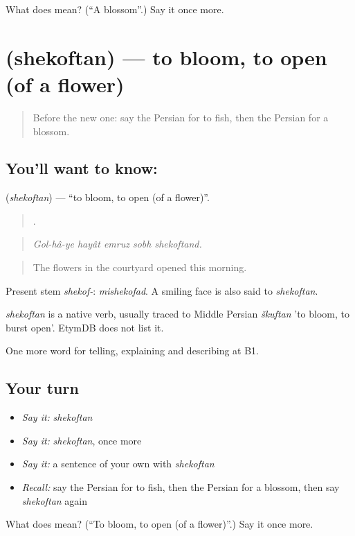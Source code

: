\begin{tcolorbox}[breakable,colback=teal!4,colframe=teal!35!black,title={Before you move on}]
What does  mean? (\textquotedblleft{}A blossom\textquotedblright{}.) Say it once more.
\end{tcolorbox}
\section[\texorpdfstring{\fa{شکفتن} (shekoftan)}{شکفتن (shekoftan)}]{ (shekoftan) — to bloom, to open (of a flower)}

\label{lesson:FA-C471-shekoftan}



\begin{quote}
Before the new one: say the Persian for to fish, then the Persian for a blossom.
\end{quote}

\subsection*{You'll want to know: }
\textbf{} (\emph{shekoftan}) — \textquotedblleft{}to bloom, to open (of a flower)\textquotedblright{}.

\begin{quote}
    .
\end{quote}

\begin{quote}
\emph{Gol-hâ-ye hayât emruz sobh shekoftand.}
\end{quote}

\begin{quote}
The flowers in the courtyard opened this morning.
\end{quote}

Present stem \emph{shekof-}: \emph{mishekofad}. A smiling face is also said to \emph{shekoftan}.

\begin{cousinweb}
\emph{shekoftan} is a native verb, usually traced to Middle Persian \emph{škuftan} 'to bloom, to burst open'. EtymDB does not list it.
\end{cousinweb}

\begin{grammarlens}[title={What you've built}]
One more word for telling, explaining and describing at B1.
\end{grammarlens}

\subsection*{Your turn}
\begin{itemize}
\raggedright
  \item \emph{Say it:} \emph{shekoftan}
  \item \emph{Say it:} \emph{shekoftan}, once more
  \item \emph{Say it:} a sentence of your own with \emph{shekoftan}
  \item \emph{Recall:} say the Persian for to fish, then the Persian for a blossom, then say \emph{shekoftan} again
\end{itemize}

\begin{tcolorbox}[breakable,colback=teal!4,colframe=teal!35!black,title={Before you move on}]
What does  mean? (\textquotedblleft{}To bloom, to open (of a flower)\textquotedblright{}.) Say it once more.
\end{tcolorbox}
